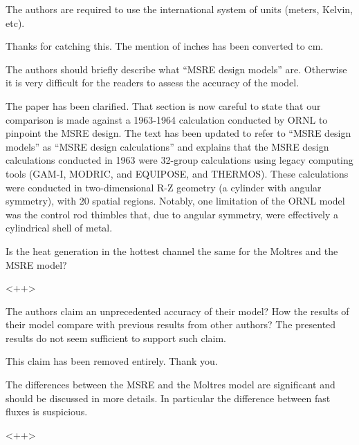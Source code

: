 \documentclass[answers,11pt]{exam}
\begin{document}
\begin{questions}
\question The authors are required to use the international system of units (meters, Kelvin, etc).
\begin{solution}
        Thanks for catching this. The mention of inches has been converted to cm.
\end{solution}

\question The authors should briefly describe what ``MSRE design models'' are. Otherwise it is very difficult for the readers to assess the accuracy of the model.
\begin{solution}
        The paper has been clarified. That section is now careful to state that 
        our comparison is made against a 1963-1964 calculation conducted by ORNL 
        to pinpoint the MSRE design. The text has been updated to refer to 
        ``MSRE design models'' as ``MSRE design calculations'' and explains 
        that the MSRE design calculations conducted in 1963 were 32-group 
        calculations using legacy computing tools (GAM-I, MODRIC, and EQUIPOSE, 
        and THERMOS). These calculations were conducted in two-dimensional R-Z 
        geometry (a cylinder with angular symmetry), with 20 spatial regions. 
        Notably, one limitation of the ORNL model was the control rod thimbles 
        that, due to angular symmetry, were effectively a cylindrical shell of 
        metal.  
\end{solution}

\question Is the heat generation in the hottest channel the same for the Moltres and the MSRE model?
\begin{solution}
        <++>
\end{solution}

\question The authors claim an unprecedented accuracy of their model? How the results of their model compare with previous results from other authors? The presented results do not seem sufficient to support such claim.
\begin{solution}
        This claim has been removed entirely. Thank you.
\end{solution}

\question The differences between the MSRE and the Moltres model are significant and should be discussed in more details. In particular the difference between fast fluxes is suspicious.
\begin{solution}
        <++>
\end{solution}


\end{questions}
\end{document}
